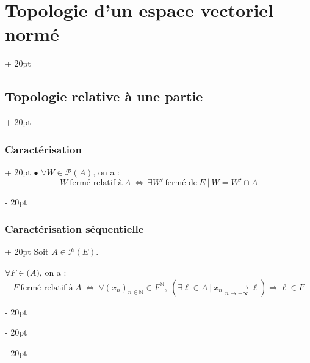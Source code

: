 \documentclass[a4paper, 12pt, twoside]{article}
\newcommand{\N}{\mathbb{N}} %
\newcommand{\tendsto}[1]{\xrightarrow[#1]{}}
\newcommand{\ssi}{\ \Leftrightarrow \ }
\newcommand{\ind}[1][20pt]{\advance\leftskip + #1}
\newcommand{\deind}[1][20pt]{\advance\leftskip - #1}
\newenvironment{indt}[2][20pt]{#2 \par \ind[#1]}{\par \deind} %
\begin{document}
\begin{indt}{\section{Topologie d'un espace vectoriel normé}}
\begin{indt}{\subsection{Topologie relative à une partie}}
\begin{indt}{\subsubsection{Caractérisation}}
                $\bullet$ $\forall W \in \mathcal P(A)$, on a :
                \[
                    W\ \text{fermé relatif à}\ A
                    \ssi
                    \exists W'\ \text{fermé de}\ E\ |\ W = W' \cap A
                \]
            \end{indt}

            \vspace{12pt}
            
            \begin{indt}{\subsubsection{Caractérisation séquentielle}}
                Soit $A \in \mathcal P(E)$.

                $\forall F \in \mathcal (A)$, on a :
                \[
                    F\ \text{fermé relatif à}\ A
                    \ssi
                    \forall (x_n)_{n \in \N} \in F^\N,\
                    (\exists \ell \in A\ |\ x_n \tendsto{n \to +\infty} \ell) \Rightarrow \ell \in F
                \]
            \end{indt}
        \end{indt}
    \end{indt}
\end{document}
